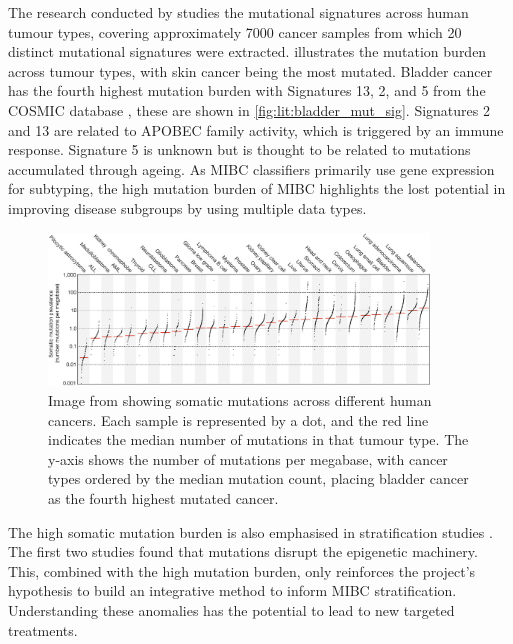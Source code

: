 The research conducted by \citet{Alexandrov2013-gi} studies the mutational signatures across human tumour types, covering approximately 7000 cancer samples from which 20 distinct mutational signatures were extracted.  illustrates the mutation burden across tumour types, with skin cancer being the most mutated. Bladder cancer has the fourth highest mutation burden with Signatures 13, 2, and 5 from the COSMIC database \citep{Tate2019-yj}, these are shown in \cref{fig:lit:bladder_mut_sig}. Signatures 2 and 13 are related to APOBEC family activity, which is triggered by an immune response. Signature 5 is unknown but is thought to be related to mutations accumulated through ageing. As MIBC classifiers primarily use gene expression for subtyping, the high mutation burden of MIBC highlights the lost potential in improving disease subgroups by using multiple data types.

\begin{figure}[!htb]    
    \centering
\includegraphics[width=0.9\textwidth,height=0.9\textheight,keepaspectratio]{Sections/Lit_review/Resources/mut_sig_cancers.jpg}
    \caption{Image from \cite{Alexandrov2013-gi} showing somatic mutations across different human cancers. Each sample is represented by a dot, and the red line indicates the median number of mutations in that tumour type. The y-axis shows the number of mutations per megabase, with cancer types ordered by the median mutation count, placing bladder cancer as the fourth highest mutated cancer.}
    \label{fig:lit:cancer_mut_sig}
\end{figure}

The high somatic mutation burden is also emphasised in stratification studies \cite{Tcga2014-dr, Robertson2017-mg, Kamoun2020-tj}. The first two studies found that mutations disrupt the epigenetic machinery. This, combined with the high mutation burden, only reinforces the project's hypothesis to build an integrative method to inform MIBC stratification. Understanding these anomalies has the potential to lead to new targeted treatments.

